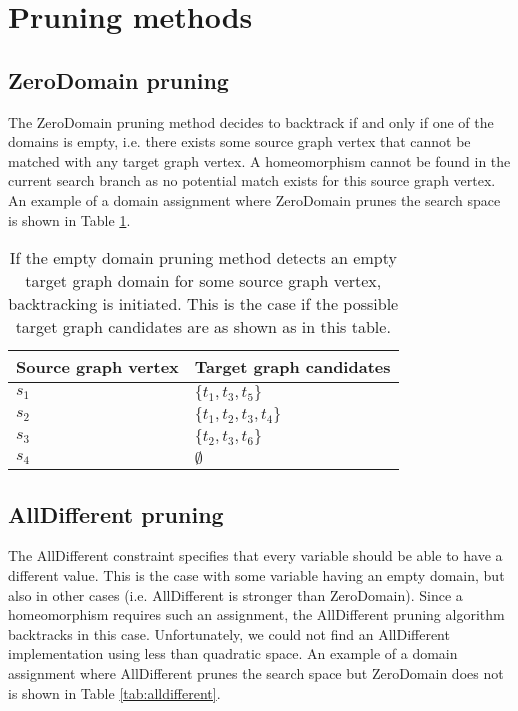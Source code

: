 \section{Pruning methods}
\label{sec:pruningmethods}
\subsection{ZeroDomain pruning}
The ZeroDomain pruning method decides to backtrack if and only if one of the domains is empty, i.e. there exists some source graph vertex that cannot be matched with any target graph vertex. A homeomorphism cannot be found in the current search branch as no potential match exists for this source graph vertex. An example of a domain assignment where ZeroDomain prunes the search space is shown in Table \ref{tab:zerodomain}.

\label{sec:emptyDomain}
\begin{table}
\centering
\begin{tabular}{|l|l|}
\hline
\textbf{Source graph vertex} & \textbf{Target graph candidates} \\ \hline
$s_1$                          & $\{t_1, t_3, t_5\}$         \\ \hline
$s_2$                          & $\{t_1, t_2, t_3, t_4\}$       \\ \hline
$s_3$                          & $\{t_2, t_3, t_6\}$      \\ \hline
$s_4$                          & $\emptyset$                      \\ \hline
\end{tabular}
\caption{If the empty domain pruning method detects an empty target graph domain for some source graph vertex, backtracking is initiated. This is the case if the possible target graph candidates are as shown as in this table.}
\label{tab:zerodomain}
\end{table}

\subsection{AllDifferent pruning}
\label{sec:alldifferent}
The AllDifferent constraint specifies that every variable should be able to have a different value. This is the case with some variable having an empty domain, but also in other cases (i.e. AllDifferent is stronger than ZeroDomain). Since a homeomorphism requires such an assignment, the AllDifferent pruning algorithm backtracks in this case. Unfortunately, we could not find an AllDifferent implementation using less than quadratic space. An example of a domain assignment where AllDifferent prunes the search space but ZeroDomain does not is shown in Table \ref{tab:alldifferent}. 

